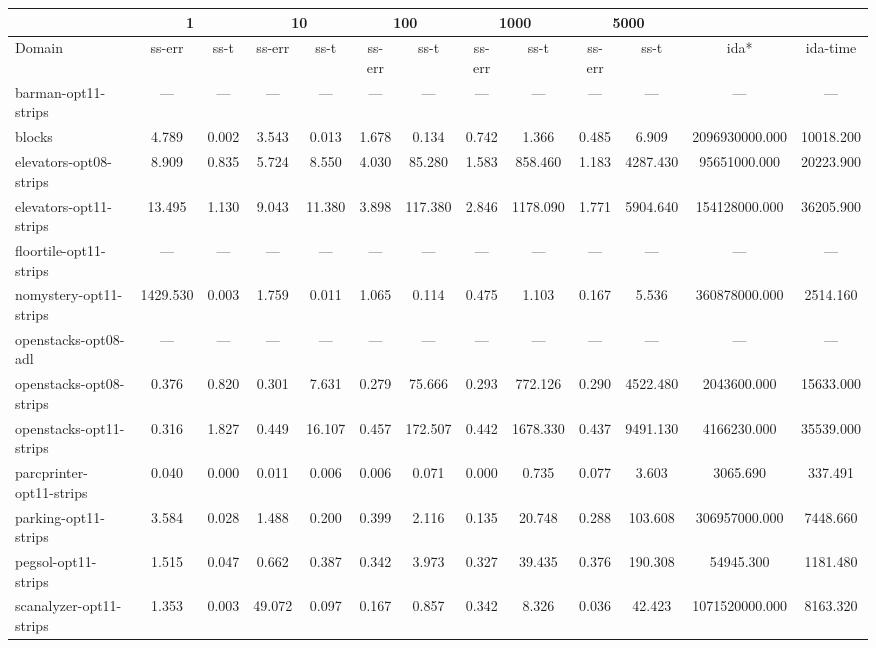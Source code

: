 \documentclass[a4paper,12pt]{article}
\begin{document}
\begin{table}[]
\begin{tabular}{l@{\hspace{4pt}} *{12}{c}}
                  & \multicolumn{2}{|c|}{1} & \multicolumn{2}{c|}{10} & \multicolumn{2}{c|}{100} & \multicolumn{2}{c|}{1000} & \multicolumn{2}{c|}{5000}                   \\ \hline
Domain                  & ss-err  & ss-t  & ss-err  & ss-t  & ss-err  & ss-t  & ss-err  & ss-t  & ss-err  & ss-t  & ida*  & ida-time  \\ \hline
barman-opt11-strips     & --- & --- & --- & --- & --- & --- & --- & --- & --- & --- & --- & --- \\ \hline
blocks                  & 4.789 & 0.002 & 3.543 & 0.013 & 1.678 & 0.134 & 0.742 & 1.366 & 0.485 & 6.909 & 2096930000.000 & 10018.200 \\ \hline
elevators-opt08-strips  & 8.909 & 0.835 & 5.724 & 8.550 & 4.030 & 85.280 & 1.583 & 858.460 & 1.183 & 4287.430 & 95651000.000 & 20223.900 \\ \hline
elevators-opt11-strips  & 13.495 & 1.130 & 9.043 & 11.380 & 3.898 & 117.380 & 2.846 & 1178.090 & 1.771 & 5904.640 & 154128000.000 & 36205.900 \\ \hline
floortile-opt11-strips  & --- & --- & --- & --- & --- & --- & --- & --- & --- & --- & --- & --- \\ \hline
nomystery-opt11-strips  & 1429.530 & 0.003 & 1.759 & 0.011 & 1.065 & 0.114 & 0.475 & 1.103 & 0.167 & 5.536 & 360878000.000 & 2514.160 \\ \hline
openstacks-opt08-adl    & --- & --- & --- & --- & --- & --- & --- & --- & --- & --- & --- & --- \\ \hline
openstacks-opt08-strips & 0.376 & 0.820 & 0.301 & 7.631 & 0.279 & 75.666 & 0.293 & 772.126 & 0.290 & 4522.480 & 2043600.000 & 15633.000 \\ \hline
openstacks-opt11-strips & 0.316 & 1.827 & 0.449 & 16.107 & 0.457 & 172.507 & 0.442 & 1678.330 & 0.437 & 9491.130 & 4166230.000 & 35539.000 \\ \hline
parcprinter-opt11-strips& 0.040 & 0.000 & 0.011 & 0.006 & 0.006 & 0.071 & 0.000 & 0.735 & 0.077 & 3.603 & 3065.690 & 337.491 \\ \hline
parking-opt11-strips    & 3.584 & 0.028 & 1.488 & 0.200 & 0.399 & 2.116 & 0.135 & 20.748 & 0.288 & 103.608 & 306957000.000 & 7448.660 \\ \hline
pegsol-opt11-strips     & 1.515 & 0.047 & 0.662 & 0.387 & 0.342 & 3.973 & 0.327 & 39.435 & 0.376 & 190.308 & 54945.300 & 1181.480 \\ \hline
scanalyzer-opt11-strips & 1.353 & 0.003 & 49.072 & 0.097 & 0.167 & 0.857 & 0.342 & 8.326 & 0.036 & 42.423 & 1071520000.000 & 8163.320 \\ \hline

\end{tabular}
\end{table}
\end{document}
